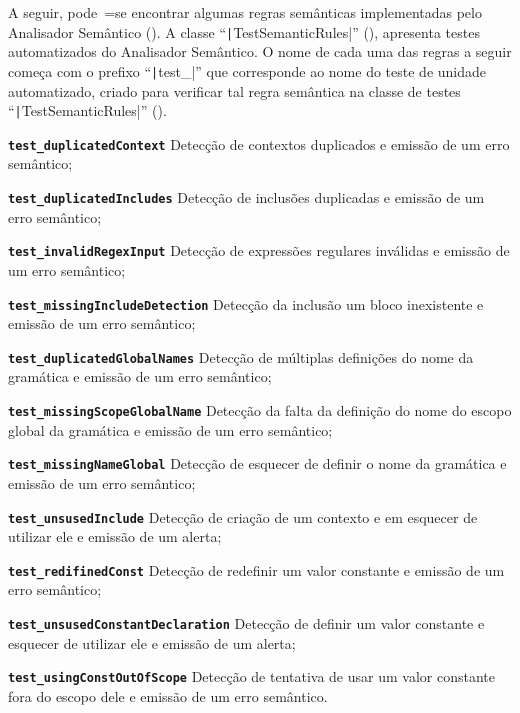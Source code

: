 A seguir,
pode~=se encontrar algumas regras semânticas implementadas pelo Analisador Semântico ().
A classe ``\texttt|TestSemanticRules|'' (),
apresenta testes automatizados do Analisador Semântico.
O nome de cada uma das regras a seguir começa com o prefixo ``\texttt|test_|'' que corresponde ao nome do teste de unidade automatizado,
criado para verificar tal regra semântica na classe de testes ``\texttt|TestSemanticRules|'' ().
\begin{enumerateoptional}[1)]
    \item[\bfseries\texttt{test_duplicatedContext}] Detecção de contextos duplicados e
    emissão de um erro semântico;

    \item[\bfseries\texttt{test_duplicatedIncludes}] Detecção de inclusões duplicadas  e
    emissão de um erro semântico;

    \item[\bfseries\texttt{test_invalidRegexInput}] Detecção de expressões regulares inválidas e
    emissão de um erro semântico;

    \item[\bfseries\texttt{test_missingIncludeDetection}] Detecção da inclusão um bloco inexistente e
    emissão de um erro semântico;

    \item[\bfseries\texttt{test_duplicatedGlobalNames}] Detecção de múltiplas definições do nome da gramática e
    emissão de um erro semântico;

    \item[\bfseries\texttt{test_missingScopeGlobalName}] Detecção da falta da definição do nome do escopo global da gramática e
    emissão de um erro semântico;

    \item[\bfseries\texttt{test_missingNameGlobal}] Detecção de esquecer de definir o nome da gramática e
    emissão de um erro semântico;

    \item[\bfseries\texttt{test_unsusedInclude}] Detecção de criação de um contexto e
    em esquecer de utilizar ele e
    emissão de um alerta;

    \item[\bfseries\texttt{test_redifinedConst}] Detecção de redefinir um valor constante e
    emissão de um erro semântico;

    \item[\bfseries\texttt{test_unsusedConstantDeclaration}] Detecção de definir um valor constante e esquecer de utilizar ele e
    emissão de um alerta;

    \item[\bfseries\texttt{test_usingConstOutOfScope}] Detecção de tentativa de usar um valor constante fora do escopo dele e
    emissão de um erro semântico.
\end{enumerateoptional}%
